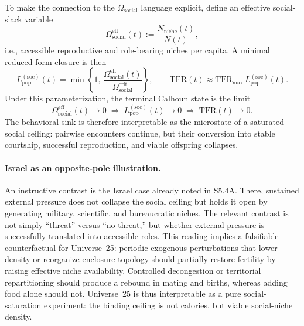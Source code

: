 \documentclass[11pt]{article}
\begin{document}
To make the connection to the $\Omega_{\mathrm{social}}$ language
explicit, define an effective social-slack variable
\[
\Omega_{\mathrm{social}}^{\mathrm{eff}}(t)
:=\frac{N_{\mathrm{niche}}(t)}{N(t)},
\]
i.e., accessible reproductive and role-bearing niches per capita.
A minimal reduced-form closure is then
\[
L_{\mathrm{pop}}^{(\mathrm{soc})}(t)
=
\min\!\left\{1,\,
\frac{\Omega_{\mathrm{social}}^{\mathrm{eff}}(t)}
     {\Omega_{\mathrm{social}}^{\mathrm{crit}}}
\right\},
\qquad
\mathrm{TFR}(t)\approx \mathrm{TFR}_{\max}\,
L_{\mathrm{pop}}^{(\mathrm{soc})}(t).
\]
Under this parameterization, the terminal Calhoun state is the limit
\[
\Omega_{\mathrm{social}}^{\mathrm{eff}}(t)\to 0
\;\Longrightarrow\;
L_{\mathrm{pop}}^{(\mathrm{soc})}(t)\to 0
\;\Longrightarrow\;
\mathrm{TFR}(t)\to 0.
\]
The behavioral sink is therefore interpretable as the microstate of a
saturated social ceiling: pairwise encounters continue, but their
conversion into stable courtship, successful reproduction, and viable
offspring collapses.

\paragraph{Israel as an opposite-pole illustration.}
An instructive contrast is the Israel case already noted in S5.4A.
There, sustained external pressure does not collapse the social ceiling
but holds it open by generating military, scientific, and bureaucratic
niches.  The relevant contrast is not simply ``threat'' versus
``no threat,'' but whether external pressure is successfully translated
into accessible roles.  This reading implies a falsifiable counterfactual
for Universe~25: periodic exogenous perturbations that lower density or
reorganize enclosure topology should partially restore fertility by
raising effective niche availability.  Controlled decongestion or
territorial repartitioning should produce a rebound in mating and births,
whereas adding food alone should not.  Universe~25 is thus interpretable
as a pure social-saturation experiment: the binding ceiling is not
calories, but viable social-niche density.

\end{document}
